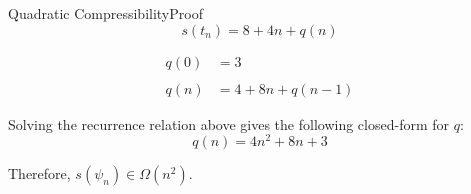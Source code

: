 \documentclass[9pt]{beamer}
\newcommand{\mypause}{\pause}
\begin{document}
\begin{frame}{Quadratic Compressibility}{Proof}
$$
s(t_n) = 8 + 4n + q(n)
$$

\medskip

\begin{align*}
q(0) & =   3 \\
	   & \\
q(n) & =  4 + 8n + q(n-1)
\end{align*} 

\medskip
\medskip
Solving the recurrence relation above gives the following closed-form for $q$:
$$
q(n) = 4n^2 + 8n + 3
$$
%

\medskip
\noindent
Therefore, \alert{$s(\psi_n) \in \Omega(n^2)$}.
\end{frame}

\end{document}
